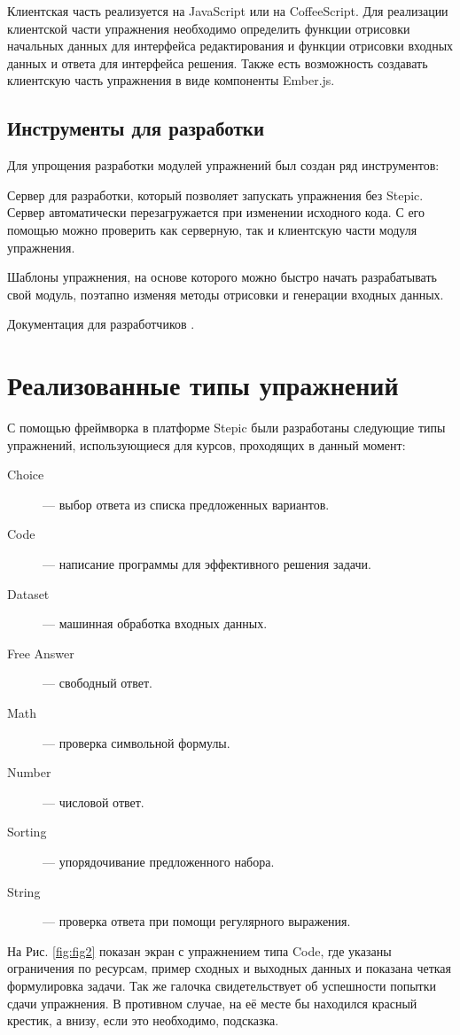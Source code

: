 \documentclass{matmex-diploma-custom}
\begin{document}
Клиентская часть реализуется на JavaScript или на CoffeeScript. Для
реализации клиентской части упражнения необходимо определить функции
отрисовки начальных данных для интерфейса редактирования и функции
отрисовки входных данных и ответа для интерфейса решения. Также есть
возможность создавать клиентскую часть упражнения в виде компоненты
Ember.js.

\subsection{Инструменты для разработки}
Для упрощения разработки модулей упражнений был создан ряд
инструментов:

Сервер для разработки, который позволяет запускать упражнения без
Stepic. Сервер автоматически перезагружается при изменении исходного
кода. С его помощью можно проверить как серверную, так и клиентскую
части модуля упражнения.

Шаблоны упражнения, на основе которого можно быстро начать
разрабатывать свой модуль, поэтапно изменяя методы отрисовки и
генерации входных данных.

Документация для разработчиков \cite{plugins:doc}.

\section{Реализованные типы упражнений}

С помощью фреймворка в платформе Stepic были разработаны следующие
типы упражнений, использующиеся для курсов, проходящих в данный
момент:
\begin{description}
\item[Choice] --- выбор ответа из списка предложенных вариантов.
\item[Code] --- написание программы для эффективного решения задачи.
\item[Dataset] --- машинная обработка входных данных.
\item[Free Answer] --- свободный ответ.
\item[Math] --- проверка символьной формулы.
\item[Number] --- числовой ответ.
\item[Sorting] --- упорядочивание предложенного набора.
\item[String] --- проверка ответа при помощи регулярного выражения.
\end{description}

На Рис. \ref{fig:fig2} показан экран с упражнением типа Code, где
указаны ограничения по ресурсам, пример сходных и выходных данных и
показана четкая формулировка задачи. Так же галочка свидетельствует об
успешности попытки сдачи упражнения. В противном случае, на её месте
бы находился красный крестик, а внизу, если это необходимо, подсказка.
\end{document}
